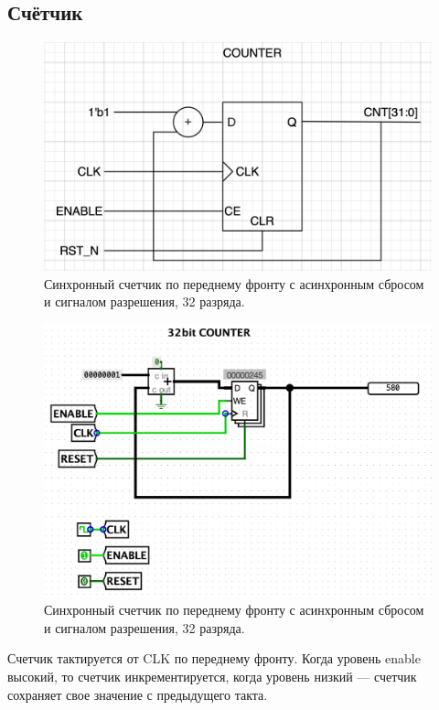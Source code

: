 \documentclass[12pt,onecolumn]{article}
\begin{document}
\subsection{Счётчик}
\begin{figure}[H]
  \centering
  \includegraphics[width=\textwidth]{image/counter.png}
  \caption{Синхронный счетчик по переднему фронту с асинхронным сбросом и сигналом разрешения, 32 разряда.}
\end{figure}
\begin{figure}[H]
    \centering
    \includegraphics[width=\textwidth]{image/counter-d.png}
    \caption{Синхронный счетчик по переднему фронту с асинхронным сбросом и сигналом разрешения, 32 разряда.}
\end{figure}

Счетчик тактируется от CLK по переднему фронту. Когда уровень enable высокий,
то счетчик инкрементируется, когда уровень низкий — счетчик сохраняет свое
значение с предыдущего такта. 
\end{document}
